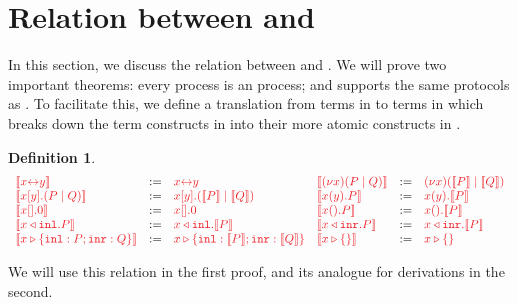\documentclass[submission,copyright,creativecommons]{eptcs}
\newtheorem{definition}[lemma]{Definition}
\begin{document}
\section{Relation between \cp and \hcp}
\label{sec:cp2hcp}

In this section, we discuss the relation between \cp and \hcp. We will prove two important theorems: every \cp process is an \hcp process; and \hcp supports the same protocols as \cp. To facilitate this, we define a translation from terms in \cp to terms in \hcp which breaks down the term constructs in \cp into their more atomic constructs in \hcp.
\begin{definition}\label{def:cp2hcp-terms}
  \[
    \begin{array}{lcllcl}
         \tm{\mtf{\cpLink{x}{y}}}
      &  := & \tm{\cpLink{x}{y}}
      &  \tm{\mtf{\cpCut{x}{P}{Q}}}
      &  := & \tm{\piNew{x}{(\piPar{\mtf{P}}{\mtf{Q}})}}
      \\ \tm{\mtf{\cpSend{x}{y}{P}{Q}}}
      &  := & \tm{\piBoundSend{x}{y}{(\piPar{\mtf{P}}{\mtf{Q}})}}
      &  \tm{\mtf{\cpRecv{x}{y}{P}}}
      &  := & \tm{\piRecv{x}{y}{\mtf{P}}}
      \\ \tm{\mtf{\cpHalt{x}}}
      &  := & \tm{\piBoundSend{x}{}{\piHalt}}
      &  \tm{\mtf{\cpWait{x}{P}}}
      &  := & \tm{\piRecv{x}{}{\mtf{P}}}
      \\ \tm{\mtf{\cpInl{x}{P}}}
      &  := & \tm{\cpInl{x}{\mtf{P}}}
      &  \tm{\mtf{\cpInr{x}{P}}}
      &  := & \tm{\cpInr{x}{\mtf{P}}}
      \\ \tm{\mtf{\cpCase{x}{P}{Q}}}
      &  := & \tm{\cpCase{x}{\mtf{P}}{\mtf{Q}}}
      &  \tm{\mtf{\cpAbsurd{x}}}
      &  := & \tm{\cpAbsurd{x}}
    \end{array}
  \]
\end{definition}\noindent
We will use this relation in the first proof, and its analogue for derivations in the second.
\end{document}
